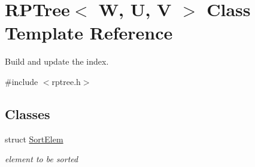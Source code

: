 \hypertarget{classRPTree}{\section{R\-P\-Tree$<$ W, U, V $>$ Class Template Reference}
\label{classRPTree}
}


Build and update the index.  




{\ttfamily \#include $<$rptree.\-h$>$}

\subsection*{Classes}
\begin{DoxyCompactItemize}
\item 
struct \hyperlink{structRPTree_1_1SortElem}{Sort\-Elem}
\begin{DoxyCompactList}\small\item\em element to be sorted \end{DoxyCompactList}\end{DoxyCompactItemize}
